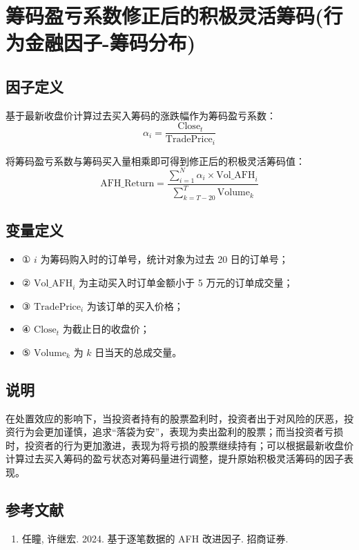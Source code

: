 \documentclass{article}
\begin{document}
\section{筹码盈亏系数修正后的积极灵活筹码(行为金融因子-筹码分布)}

\subsection{因子定义}
基于最新收盘价计算过去买入筹码的涨跌幅作为筹码盈亏系数：
\begin{equation}
    \alpha_i = \frac{\mathrm{Close}_t}{\mathrm{TradePrice}_i}
\end{equation}

将筹码盈亏系数与筹码买入量相乘即可得到修正后的积极灵活筹码值：
\begin{equation}
    \mathrm{AFH\_Return} = \frac{\sum_{i=1}^{N} \alpha_i \times \mathrm{Vol\_AFH}_i}{\sum_{k=T-20}^{T} \mathrm{Volume}_k}
\end{equation}

\subsection{变量定义}
\begin{itemize}
    \item ① \( i \) 为筹码购入时的订单号，统计对象为过去 20 日的订单号；
    \item ② \( \mathrm{Vol\_AFH}_i \) 为主动买入时订单金额小于 5 万元的订单成交量；
    \item ③ \( \mathrm{TradePrice}_i \) 为该订单的买入价格；
    \item ④ \( \mathrm{Close}_t \) 为截止日的收盘价；
    \item ⑤ \( \mathrm{Volume}_k \) 为 \( k \) 日当天的总成交量。
\end{itemize}

\subsection{说明}
在处置效应的影响下，当投资者持有的股票盈利时，投资者出于对风险的厌恶，投资行为会更加谨慎，追求“落袋为安”，表现为卖出盈利的股票；而当投资者亏损时，投资者的行为更加激进，表现为将亏损的股票继续持有；可以根据最新收盘价计算过去买入筹码的盈亏状态对筹码量进行调整，提升原始积极灵活筹码的因子表现。

\subsection{参考文献}
\begin{enumerate}
    \item 任瞳, 许继宏. 2024. 基于逐笔数据的 AFH 改进因子. 招商证券.
\end{enumerate}
\end{document}
